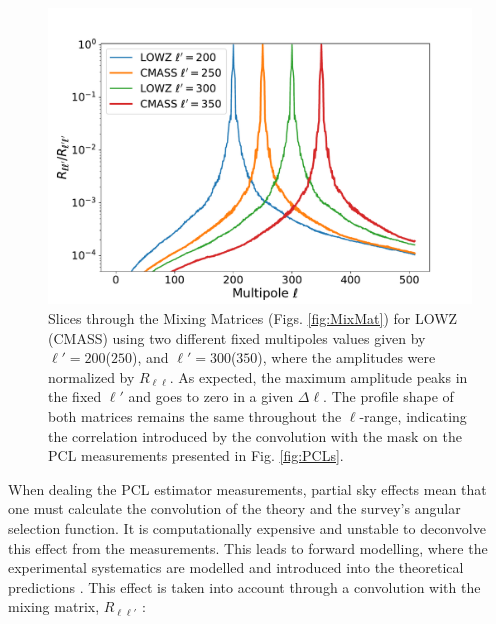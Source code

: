 \begin{figure}
\begin{center}
\includegraphics[scale=0.45]{BOSS-FIGS/Rll_200_300.pdf}
\caption[Slices through the Mixing Matrices.]{Slices through the Mixing Matrices (Figs. \ref{fig:MixMat}) for LOWZ (CMASS) using two different fixed multipoles values given by $\ell'=200$($250$), and $\ell'=300$($350$), where the amplitudes were normalized by $R_{\ell\ell}$. As expected, the maximum amplitude peaks in the fixed $\ell'$ and goes to zero in a given $\Delta\ell$. The profile shape of both matrices remains the same throughout the $\ell$-range, indicating the correlation introduced by the convolution with the mask on the PCL measurements presented in Fig. \ref{fig:PCLs}.}
\label{fig:Rll_slice}
\end{center}
\end{figure}

When dealing the PCL estimator measurements, partial sky effects mean that one must calculate the convolution of the theory and the survey's angular selection function. It is computationally expensive and unstable to deconvolve this effect from the measurements. This leads to forward modelling, where the experimental systematics are modelled and introduced into the theoretical predictions \citep{ScharfLahav1992,FisherLahav1994,Thomas2011}. This effect is taken into account through a convolution with the mixing matrix, $R_{\ell \ell'}$ \citep{Peebles1973_2,PolSpice2001,PolSpice2005,Blake2007}:

